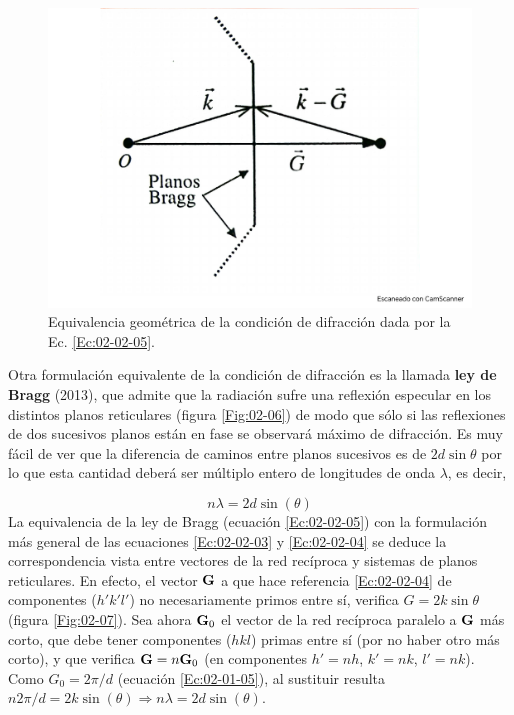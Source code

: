 \begin{figure}[h!] \centering
    \includegraphics[scale=0.35]{Cuerpo/Ch_02/Fotos_libro 5.pdf}
    \caption{Equivalencia geométrica de la condición de difracción dada por la Ec. \ref{Ec:02-02-05}.}
    \label{Fig:02-05}
\end{figure}

Otra formulación equivalente de la condición de difracción es la llamada \textbf{ley de Bragg} (2013), que admite que la radiación sufre una reflexión especular en los distintos planos reticulares (figura \ref{Fig:02-06}) de modo que sólo si las reflexiones de dos sucesivos planos están en fase se observará máximo de difracción. Es muy fácil de ver que la diferencia de caminos entre planos sucesivos es de $2d\sin \theta$ por lo que esta cantidad deberá ser múltiplo entero de longitudes de onda $\lambda$, es decir,

\begin{equation}
    n \lambda = 2 d \sin (\theta) \label{Ec:02-02-05}
\end{equation}
La equivalencia de la ley de Bragg (ecuación \ref{Ec:02-02-05}) con la formulación más general de las ecuaciones \ref{Ec:02-02-03} y \ref{Ec:02-02-04} se deduce la correspondencia vista entre vectores de la red recíproca y sistemas de planos reticulares. En efecto, el vector $\mathbf{G}$ a que hace referencia \ref{Ec:02-02-04} de componentes ($h' k' l'$) no necesariamente primos entre sí, verifica $G=2k\sin \theta$ (figura \ref{Fig:02-07}). Sea ahora $\mathbf{G}_0$ el vector de la red recíproca paralelo a $\mathbf{G}$ más corto, que debe tener componentes ($hkl$) primas entre sí (por no haber otro más corto), y que verifica $\mathbf{G} = n \mathbf{G}_0$ (en componentes $h'=nh$, $k'=nk$, $l'=nk$). Como $G_0 = 2\pi/d$ (ecuación \ref{Ec:02-01-05}), al sustituir resulta $n2\pi/d=2k\sin (\theta) \Rightarrow n \lambda = 2 d \sin (\theta)$. 

